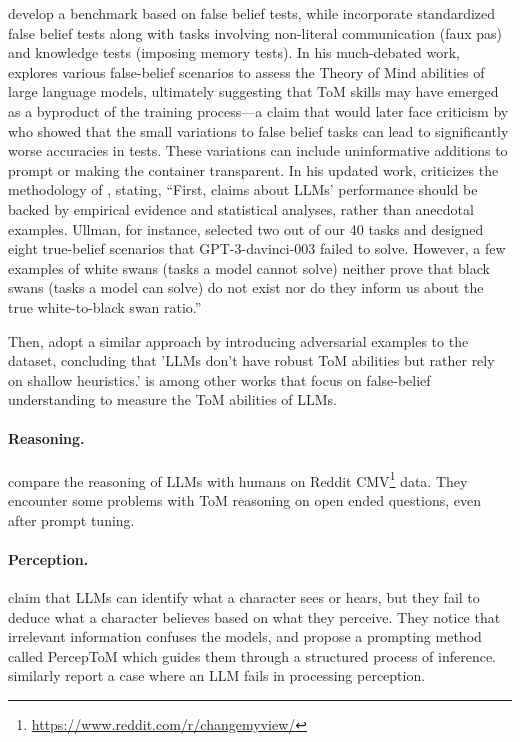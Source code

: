 \citet{ma2023tomchallengesprincipleguideddatasetdiverse} develop a benchmark based on false belief tests, while \cite{van-duijn-etal-2023-theory} incorporate standardized false belief tests along with tasks involving non-literal communication (faux pas) and knowledge tests (imposing memory tests). In his much-debated work, \citet{kosinski2024evaluatinglargelanguagemodels} explores various false-belief scenarios to assess the Theory of Mind abilities of large language models, ultimately suggesting that ToM skills may have emerged as a byproduct of the training process—a claim that would later face criticism by \citet{ullman2023largelanguagemodelsfail} who showed that the small variations to false belief tasks can lead to significantly worse accuracies in tests. These variations can include uninformative additions to prompt or making the container transparent. 
In his updated work, \citet{kosinski2024evaluatinglargelanguagemodels} criticizes the methodology of \citet{ullman2023largelanguagemodelsfail}, stating, \enquote{First, claims about LLMs’ performance should be backed by empirical evidence and statistical analyses, rather than anecdotal examples. Ullman, for instance, selected two out of our 40 tasks and designed eight true-belief scenarios that GPT-3-davinci-003 failed to solve. However, a few examples of white swans (tasks a model cannot solve) neither prove that black swans (tasks a model can solve) do not exist nor do they inform us about the true white-to-black swan ratio.}

Then, \citet{shapira2023cleverhansneuraltheory} adopt a similar approach by introducing adversarial examples to the dataset, concluding that 'LLMs don’t have robust ToM abilities but rather rely on shallow heuristics.' \citet{kim2023fantombenchmarkstresstestingmachine} is among other works that focus on false-belief understanding to measure the ToM abilities of LLMs.

\paragraph{Reasoning.} \citet{amirizaniani2024llmsexhibithumanlikereasoning} compare the reasoning of LLMs with humans on Reddit CMV\footnote{\url{https://www.reddit.com/r/changemyview/}} data. They encounter some problems with ToM reasoning on open ended questions, even after prompt tuning.

\paragraph{Perception.} \citet{jung2024perceptionsbeliefsexploringprecursory} claim that LLMs can identify what a character sees or hears, but they fail to deduce what a character believes based on what they perceive. They notice that irrelevant information confuses the models, and propose a prompting method called PercepToM which guides them through a structured process of inference. \citet{kosoy2023comparingmachineschildrenusing} similarly report a case where an LLM fails in processing perception.

